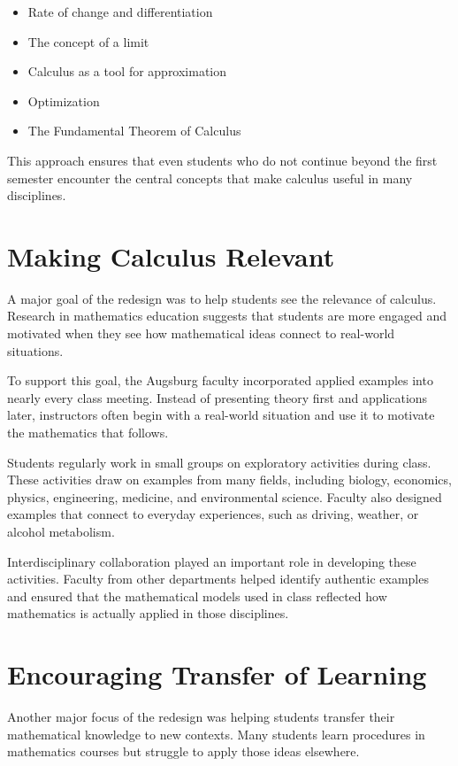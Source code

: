 \documentclass[11pt]{article}
\begin{document}
\begin{itemize}
\item Rate of change and differentiation
\item The concept of a limit
\item Calculus as a tool for approximation
\item Optimization
\item The Fundamental Theorem of Calculus
\end{itemize}

This approach ensures that even students who do not continue beyond the first semester encounter the central concepts that make calculus useful in many disciplines.

\section*{Making Calculus Relevant}

A major goal of the redesign was to help students see the relevance of calculus. Research in mathematics education suggests that students are more engaged and motivated when they see how mathematical ideas connect to real-world situations.

To support this goal, the Augsburg faculty incorporated applied examples into nearly every class meeting. Instead of presenting theory first and applications later, instructors often begin with a real-world situation and use it to motivate the mathematics that follows.

Students regularly work in small groups on exploratory activities during class. These activities draw on examples from many fields, including biology, economics, physics, engineering, medicine, and environmental science. Faculty also designed examples that connect to everyday experiences, such as driving, weather, or alcohol metabolism.

Interdisciplinary collaboration played an important role in developing these activities. Faculty from other departments helped identify authentic examples and ensured that the mathematical models used in class reflected how mathematics is actually applied in those disciplines.

\section*{Encouraging Transfer of Learning}

Another major focus of the redesign was helping students transfer their mathematical knowledge to new contexts. Many students learn procedures in mathematics courses but struggle to apply those ideas elsewhere.
\end{document}

